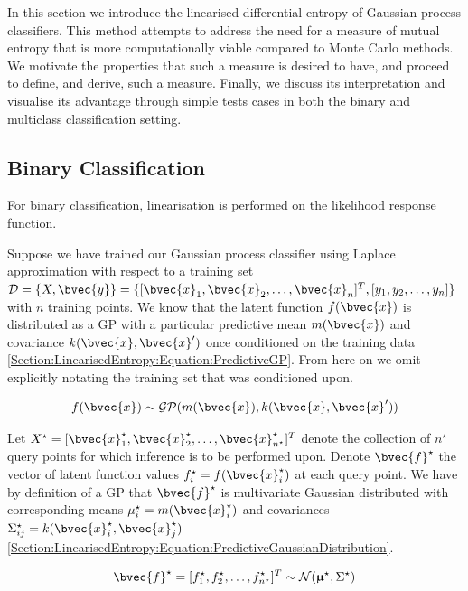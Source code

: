 \documentclass{article}
\renewcommand{\vec}[1]{\boldsymbol{#1}}
\begin{document}
	In this section we introduce the linearised differential entropy of Gaussian process classifiers. This method attempts to address the need for a measure of mutual entropy that is more computationally viable compared to Monte Carlo methods. We motivate the properties that such a measure is desired to have, and proceed to define, and derive, such a measure. Finally, we discuss its interpretation and visualise its advantage through simple tests cases in both the binary and multiclass classification setting.
	
	\subsection{Binary Classification}

		For binary classification, linearisation is performed on the likelihood response function.
	
		Suppose we have trained our Gaussian process classifier using Laplace approximation with respect to a training set $\mathcal{D} = \{X, \bvec{y}\} = \{[ \bvec{x}_{1}, \bvec{x}_{2}, \dots, \bvec{x}_{n}]^{T}, [y_{1}, y_{2}, \dots, y_{n}]\}$ with $n$ training points. We know that the latent function $f(\bvec{x})$ is distributed as a GP with a particular predictive mean $m(\bvec{x})$ and covariance $k(\bvec{x}, \bvec{x}')$ once conditioned on the training data \eqref{Section:LinearisedEntropy:Equation:PredictiveGP}. From here on we omit explicitly notating the training set that was conditioned upon.
		
		\begin{equation}
			f(\bvec{x}) \sim \mathcal{GP}(m(\bvec{x}), k(\bvec{x}, \bvec{x}'))
		\label{Section:LinearisedEntropy:Equation:PredictiveGP}
		\end{equation}
		
		Let $X^{\star} = [ \bvec{x}^{\star}_{1}, \bvec{x}^{\star}_{2}, \dots, \bvec{x}^{\star}_{n^{\star}}]^{T}$ denote the collection of $n^{\star}$ query points for which inference is to be performed upon. Denote $\bvec{f}^{\star}$ the vector of latent function values $f^{\star}_{i} = f(\bvec{x}^{\star}_{i})$ at each query point. We have by definition of a GP that $\bvec{f}^{\star}$ is multivariate Gaussian distributed with corresponding means $\mu^{\star}_{i} = m(\bvec{x}^{\star}_{i})$ and covariances $\Sigma^{\star}_{ij} = k(\bvec{x}^{\star}_{i}, \bvec{x}^{\star}_{j})$ \eqref{Section:LinearisedEntropy:Equation:PredictiveGaussianDistribution}.
		
		\begin{equation}
			\bvec{f}^{\star} = [f^{\star}_{1}, f^{\star}_{2}, \dots, f^{\star}_{n^{\star}}]^{T} \sim \mathcal{N}(\vec{\upmu}^{\star}, \Sigma^{\star})
		\label{Section:LinearisedEntropy:Equation:PredictiveGaussianDistribution}
		\end{equation}
			
\end{document}
